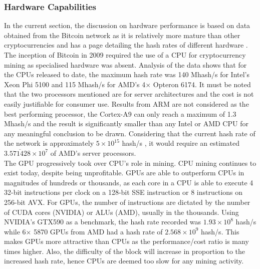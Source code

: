 \documentclass[a4paper,12pt]{article}
\newcounter{subsubsubsection}[subsubsection]
\begin{document}
{\subsubsection{Hardware Capabilities}
{\par \noindent
In the current section, the discussion on hardware performance is based on data obtained from the Bitcoin network as it is relatively more mature than other cryptocurrencies and has a page detailing the hash rates of different hardware \cite{nonspechw,spechw}. \\\newline
The inception of Bitcoin in 2009 required the use of a \ac{CPU} for cryptocurrency mining as specialised hardware was absent. Analysis of the data shows that for the \ac{CPU}s released to date, the maximum hash rate was 140 Mhash/s for Intel's Xeon Phi 5100 and 115 Mhash/s for \ac{AMD}'s 4$\times$ Opteron 6174. It must be noted that the two processors mentioned are for server architectures and the cost is not easily justifiable for consumer use. Results from \ac{ARM} are not considered as the best performing processor, the Cortex-A9 can only reach a maximum of 1.3 Mhash/s and the result is significantly smaller than any Intel or AMD \ac{CPU} for any meaningful conclusion to be drawn. Considering that the current hash rate of the network is approximately $5\times10^{15}$ hash/s \cite{bchashrate}, it would require an estimated $3.\overline{571428}\times10^7$ of \ac{AMD}'s server processors.
\\\newline
The \ac{GPU} progressively took over \ac{CPU}'s role in mining. \ac{CPU} mining continues to exist today, despite being unprofitable. \ac{GPU}s are able to outperform \ac{CPU}s in magnitudes of hundreds or thousands, as each core in a \ac{CPU} is able to execute 4 32-bit instructions per clock on a 128-bit \ac{SSE} instruction or 8 instructions on 256-bit \ac{AVX}. For \ac{GPU}s, the number of instructions are dictated by the number of CUDA cores (NVIDIA) or ALUs (\ac{AMD}), usually in the thousands. Using NVIDIA's GTX590 as a benchmark, the hash rate recorded was $1.93\times10^8$ hash/s while 6$\times$ 5870 \ac{GPU}s from \ac{AMD} had a hash rate of $2.568\times10^9$ hash/s. This makes \ac{GPU}s more attractive than \ac{CPU}s as the performance/cost ratio is many times higher. Also, the difficulty of the block will increase in proportion to the increased hash rate, hence \ac{CPU}s are deemed too slow for any mining activity.}
\\\newline
}
\end{document}
